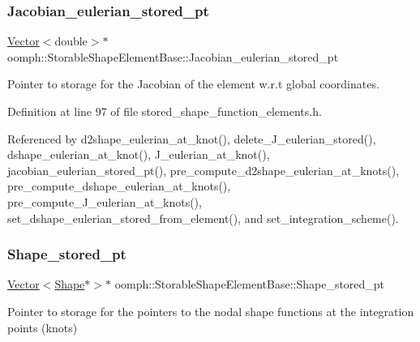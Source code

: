 \subsubsection{\texorpdfstring{Jacobian\+\_\+eulerian\+\_\+stored\+\_\+pt}{Jacobian\_eulerian\_stored\_pt}}
{\footnotesize\ttfamily \hyperlink{classoomph_1_1Vector}{Vector}$<$double$>$$\ast$ oomph\+::\+Storable\+Shape\+Element\+Base\+::\+Jacobian\+\_\+eulerian\+\_\+stored\+\_\+pt\hspace{0.3cm}{\ttfamily [private]}}



Pointer to storage for the Jacobian of the element w.\+r.\+t global coordinates. 



Definition at line 97 of file stored\+\_\+shape\+\_\+function\+\_\+elements.\+h.



Referenced by d2shape\+\_\+eulerian\+\_\+at\+\_\+knot(), delete\+\_\+\+J\+\_\+eulerian\+\_\+stored(), dshape\+\_\+eulerian\+\_\+at\+\_\+knot(), J\+\_\+eulerian\+\_\+at\+\_\+knot(), jacobian\+\_\+eulerian\+\_\+stored\+\_\+pt(), pre\+\_\+compute\+\_\+d2shape\+\_\+eulerian\+\_\+at\+\_\+knots(), pre\+\_\+compute\+\_\+dshape\+\_\+eulerian\+\_\+at\+\_\+knots(), pre\+\_\+compute\+\_\+\+J\+\_\+eulerian\+\_\+at\+\_\+knots(), set\+\_\+dshape\+\_\+eulerian\+\_\+stored\+\_\+from\+\_\+element(), and set\+\_\+integration\+\_\+scheme().

\mbox{\label{classoomph_1_1StorableShapeElementBase_a734b0aa356ab7d0796e6d70e46364d03}} 
\subsubsection{\texorpdfstring{Shape\+\_\+stored\+\_\+pt}{Shape\_stored\_pt}}
{\footnotesize\ttfamily \hyperlink{classoomph_1_1Vector}{Vector}$<$\hyperlink{classoomph_1_1Shape}{Shape}$\ast$$>$$\ast$ oomph\+::\+Storable\+Shape\+Element\+Base\+::\+Shape\+\_\+stored\+\_\+pt\hspace{0.3cm}{\ttfamily [private]}}



Pointer to storage for the pointers to the nodal shape functions at the integration points (knots) 



